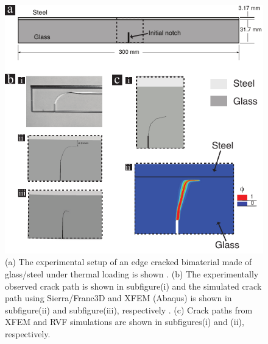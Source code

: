 \documentclass{article}
\begin{document}
\begin{figure}
    \centering
    \includegraphics[width=1.0\textwidth]{./Figures/XFEM_crack_path_fig.pdf}
    \caption{(a) The experimental setup of an edge cracked bimaterial made of glass/steel under thermal loading is shown \cite{grutzik2017development}. (b) The experimentally observed crack path is shown in subfigure(i) and the simulated crack path using Sierra/Franc3D and XFEM (Abaqus) is shown in subfigure(ii) and subfigure(iii), respectively \cite{grutzik2017development}. (c) Crack paths from XFEM and RVF simulations are shown in subfigures(i) and (ii), respectively.}
    \label{Fig:XFEM}
\end{figure}



\end{document}
